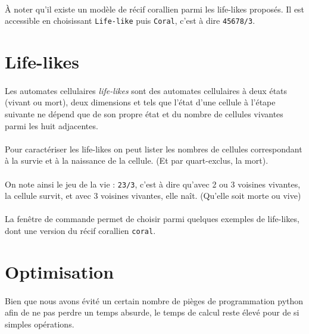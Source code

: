 \documentclass[a4paper]{article}
\begin{document}
\paragraph{} À noter qu'il existe un modèle de récif corallien parmi les life-likes proposés. Il est accessible en choisissant {\tt Life-like} puis {\tt Coral}, c'est à dire {\tt 45678/3}.

\section{Life-likes}

\paragraph{} Les automates cellulaires \textit{life-likes} sont des automates cellulaires à deux états (vivant ou mort), deux dimensions et tels que l'état d'une cellule à l'étape suivante ne dépend que de son propre état et du nombre de cellules vivantes parmi les huit adjacentes.

\paragraph{} Pour caractériser les life-likes on peut lister les nombres de cellules correspondant à la survie et à la naissance de la cellule. (Et par quart-exclus, la mort).

\paragraph{} On note ainsi le jeu de la vie : {\tt 23/3}, c'est à dire qu'avec 2 ou 3 voisines vivantes, la cellule survit, et avec 3 voisines vivantes, elle naît. (Qu'elle soit morte ou vive)

\paragraph{} La fenêtre de commande permet de choisir parmi quelques exemples de life-likes, dont une version du récif corallien {\tt coral}.

\section{Optimisation}

\paragraph{} Bien que nous avons évité un certain nombre de pièges de programmation python afin de ne pas perdre un temps absurde, le temps de calcul reste élevé pour de si simples opérations.
\end{document}
